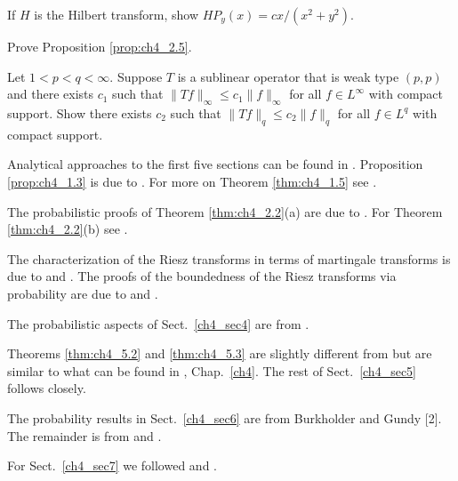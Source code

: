 \begin{exercise}\label{ex:ch4_31}
If $H$ is the Hilbert transform, show $HP_y(x) = cx/(x^2 + y^2)$.
\end{exercise}

\begin{exercise}\label{ex:ch4_32}
Prove Proposition \ref{prop:ch4_2.5}.
\end{exercise}

\begin{exercise}\label{ex:ch4_33}
Let $1 < p < q < \infty$. Suppose $T$ is a sublinear operator that is weak type $(p,p)$ and there exists $c_1$ such that $\|Tf\|_\infty \leq c_1\|f\|_\infty$ for all $f \in \allowbreak L^\infty$ with compact support. Show there exists $c_2$ such that $\|Tf\|_q \leq c_2\|f\|_q$ for all $f \in L^q$ with compact support.
\end{exercise}

\notessection
{}

Analytical approaches to the first five sections can be found in \cite{Stein1970a}. Proposition \ref{prop:ch4_1.3} is due to \cite{BurkholderGundy1973}. For more on Theorem \ref{thm:ch4_1.5} see \cite{Durrett1984}.

The probabilistic proofs of Theorem \ref{thm:ch4_2.2}(a) are due to \cite{BurkholderGundySilverstein1971}. For Theorem \ref{thm:ch4_2.2}(b) see \cite{Burkholder1973}.

The characterization of the Riesz transforms in terms of martingale transforms is due to \cite{GundySilverstein1982} and \cite{GundyVaropoulos1979}. The proofs of the boundedness of the Riesz transforms via probability are due to \cite{Bennett1985} and \cite{Banuelos1986a}.

The probabilistic aspects of Sect.\ \ref{ch4_sec4} are from \cite{Meyer1976,Meyer1981}.

Theorems \ref{thm:ch4_5.2} and \ref{thm:ch4_5.3} are slightly different from but are similar to what can be found in \cite{Stein1970a}, Chap.\ \ref{ch4}. The rest of Sect.\ \ref{ch4_sec5} follows \cite{Stein1970a} closely.

The probability results in Sect.\ \ref{ch4_sec6} are from Burkholder and Gundy [2]. The remainder is from \cite{Stein1970a} and \cite{FeffermanStein1972}.

For Sect.\ \ref{ch4_sec7} we followed \cite{Durrett1984} and \cite{FeffermanStein1972}.